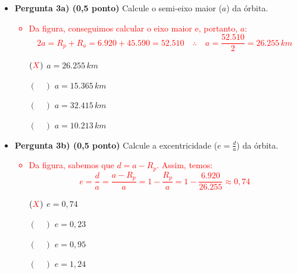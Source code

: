\documentclass[a4paper, 12pt]{article}
\newcommand{\red}[1]{\textcolor{red}{#1}}
\begin{document}
\begin{flushleft}
\begin{itemize}
\begin{figure}[H]
                \end{figure}
                \begin{itemize}
                    \item \textbf{Pergunta 3a) (0,5 ponto)} Calcule o semi-eixo maior ($a$) da órbita.
                        \red{\begin{itemize}
                            \item Da figura, conseguimos calcular o eixo maior e, portanto, $a$:
                                \begin{equation*}
                                    2a =  R_p + R_a = 6.920 + 45.590 = 52.510 \quad \therefore \quad a = \frac{52.510}{2}=26.255 \, km
                                \end{equation*}
                        \end{itemize}}
                        \begin{itemize}
                            \item[$(\red{X})$] $a = 26.255 \, km$
                            \item[$(\quad)$] $a = 15.365 \, km$
                            \item[$(\quad)$] $a = 32.415 \, km$
                            \item[$(\quad)$] $a = 10.213 \, km$
                        \end{itemize}
                    \item \textbf{Pergunta 3b) (0,5 ponto)} Calcule a excentricidade  ($e= \frac{d}{a}$) da órbita.
                        \red{\begin{itemize}
                            \item Da figura, sabemos que $d=a-R_p$. Assim, temos:
                                \begin{equation*}
                                    e=\frac{d}{a}=\frac{a-R_p}{a}=1-\frac{R_p}{a}=1-\frac{6.920}{26.255}\approx 0,74
                                \end{equation*}
                        \end{itemize}}
                        \begin{itemize}
                            \item[$(\red{X})$] $e = 0,74$
                            \item[$(\quad)$] $e = 0,23$
                            \item[$(\quad)$] $e = 0,95$
                            \item[$(\quad)$] $e = 1,24$
                        \end{itemize}
                \end{itemize}


\end{itemize}
\end{flushleft}
\end{document}
